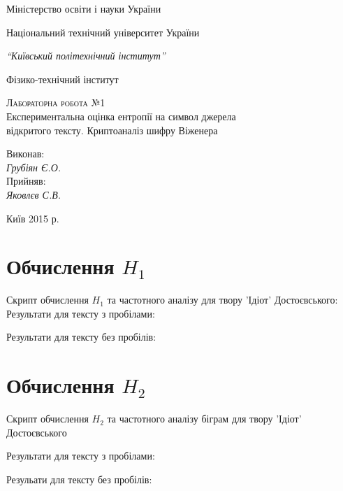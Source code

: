 \documentclass[a4paper,12pt]{article}
\begin{document}
\begin{titlepage}
  \begin{center}
    \large
    Міністерство освіти і науки України
    
    Національний технічний університет України

    \textit{“Київський політехнічний інститут”}
    
    Фізико-технічний інститут
    \vspace{5cm}

    \textsc{Лабораторна робота №1}\\[5mm]
    
    {\LARGE Експериментальна оцінка ентропії на символ джерела\\
	відкритого тексту. Криптоаналіз шифру Віженера}\\
  \bigskip
    
    
\end{center}
\vspace{3cm}
\hfill
\begin{minipage}{0.3\textwidth}
\large
  Виконав:\\
  \textit{Грубіян Є.О.}\\
  Прийняв:\\
  \textit{Яковлєв С.В.}\\ %
  
\end{minipage}
\bigskip

\vfill
\vfill
\vfill
\begin{center}
  Київ 2015 р.
\end{center}

\end{titlepage}
\section*{Обчислення \( H_1 \) }
{\large Скрипт обчислення \( H_1 \) та частотного аналізу для твору 'Ідіот' Достоєвського:}\\

\newpage
{\large Результати для тексту з пробілами: }

{\large Результати для тексту без пробілів: }

\section*{Обчислення \( H_2 \) }
{\large Скрипт обчислення \( H_2 \) та частотного аналізу біграм для твору 'Ідіот' Достоєвського}\\

\begin{landscape}
{\large Результати для тексту з пробілами: }
\end{landscape}
\begin{landscape}
{\large Резульати для тексту без пробілів: }
\end{landscape}
\newpage
\end{document}
